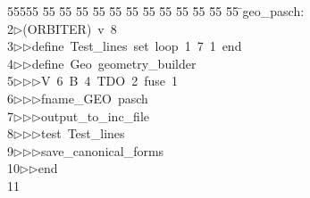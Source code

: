 %
%
\begin{tabbing}
55555 \= 55 \= 55 \= 55 \= 55 \= 55 \= 55 \= 55 \= 55 \= 55 \= 55 \= 55 \= 55 \= \>geo\_pasch:\\[0pt]
2\>$\triangleright$\>(ORBITER)\ v\ 8\ \\[0pt]
3\>$\triangleright$\>$\triangleright$\>define\ Test\_lines\ set\ loop\ 1\ 7\ 1\ end\ \\[0pt]
4\>$\triangleright$\>$\triangleright$\>define\ Geo\ geometry\_builder\ \\[0pt]
5\>$\triangleright$\>$\triangleright$\>$\triangleright$\>V\ 6\ B\ 4\ TDO\ 2\ fuse\ 1\ \\[0pt]
6\>$\triangleright$\>$\triangleright$\>$\triangleright$\>fname\_GEO\ pasch\ \\[0pt]
7\>$\triangleright$\>$\triangleright$\>$\triangleright$\>output\_to\_inc\_file\ \\[0pt]
8\>$\triangleright$\>$\triangleright$\>$\triangleright$\>test\ Test\_lines\ \\[0pt]
9\>$\triangleright$\>$\triangleright$\>$\triangleright$\>save\_canonical\_forms\ \\[0pt]
10\>$\triangleright$\>$\triangleright$\>end\\[0pt]
11\>\end{tabbing}
